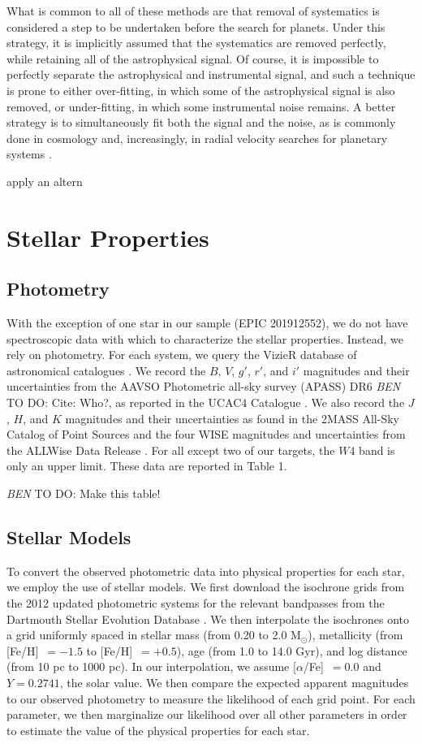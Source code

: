 \documentclass{emulateapj}
\newcommand{\msun}{{M$_\odot$}}
\newcommand{\feh}{{[Fe/H]}~}
\newcommand{\afe}{{[$\alpha$/Fe]}~}
\newcommand{\paperit}{\citet{Foreman-Mackey15}}
\newcommand{\todo}[3]{{\color{#2} \emph{#1} TO DO: #3}}
\newcommand{\btmtodo}[1]{\todo{BEN}{red}{#1}}
\begin{document}
What is common to all of these methods are that removal of systematics is considered a 
step to be undertaken before the search for planets. 
Under this strategy, it is implicitly assumed that the systematics are removed perfectly,
while retaining all of the astrophysical signal. 
Of course, it is impossible to perfectly separate the astrophysical and instrumental 
signal, and such a technique is prone to either over-fitting, in which some of the 
astrophysical signal is also removed, or under-fitting, in which some instrumental noise
remains.
A better strategy is to simultaneously fit both the signal and the noise, as is commonly
done in cosmology and, increasingly, in radial velocity searches for planetary systems
\citep[e.g.][]{Ferreira00, Boisse11, Haywood14, Grunblatt15}. 


\paperit{} apply an altern


\section{Stellar Properties}
\subsection{Photometry}

With the exception of one star in our sample (EPIC 201912552), we do not have
spectroscopic data with which to characterize the stellar properties. 
Instead, we rely on photometry.
For each system, we query the VizieR database of astronomical catalogues
\citep{Ochseinbein00}. 
We record the $B$, $V$, $g'$, $r'$, and $i'$ magnitudes and their
uncertainties from the AAVSO Photometric all-sky survey (APASS) DR6 
\btmtodo{Cite: Who?}, as reported in the UCAC4 Catalogue \citep{Zacharias12}.
We also record the $J$, $H$, and $K$ magnitudes and their uncertainties 
as found in the 2MASS All-Sky Catalog of Point Sources \citep{Cutri03}
and the four WISE magnitudes and uncertainties from the ALLWise Data
Release \citep{Cutri13}.
For all except two of our targets, the $W4$ band is only an upper limit.
These data are reported in Table 1.

\btmtodo{Make this table!}

\subsection{Stellar Models}
To convert the observed photometric data into physical properties for each
star, we employ the use of stellar models. 
We first download the isochrone grids from the 2012 updated photometric
systems for the relevant bandpasses from the Dartmouth Stellar Evolution
Database \citep{Dotter08}. 
We then interpolate the isochrones onto a grid uniformly spaced in
stellar mass (from 0.20 to 2.0 \msun), metallicity (from \feh$=-1.5$ to 
\feh$=+0.5$), age (from 1.0 to 14.0 Gyr), and log distance (from 10 pc to 
1000 pc). 
In our interpolation, we assume \afe$=0.0$ and $Y=0.2741$, the solar value.
We then compare the expected apparent magnitudes to our observed photometry
to measure the likelihood of each grid point.
For each parameter, we then marginalize our likelihood over all other 
parameters in order to estimate the value of the physical properties
for each star.
\end{document}
